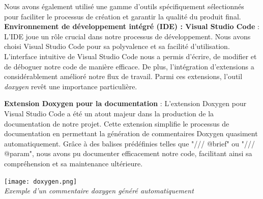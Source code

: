 \documentclass[10pt]{article}
\begin{document}
Nous avons également utilisé une gamme d'outils spécifiquement sélectionnés pour faciliter le processus de création et garantir la qualité du produit final. \\
\textbf{Environnement de développement intégré (IDE) : Visual Studio Code} :
L'IDE joue un rôle crucial dans notre processus de développement. Nous avons choisi Visual Studio Code pour sa polyvalence et sa facilité d'utilisation. L'interface intuitive de Visual Studio Code nous a permis d'écrire, de modifier et de déboguer notre code de manière efficace. De plus, l'intégration d'extensions a considérablement amélioré notre flux de travail. Parmi ces extensions, l'outil \textit{\gls{doxygen}} revêt une importance particulière.

\textbf{Extension Doxygen pour la documentation} :
L'extension Doxygen pour Visual Studio Code a été un atout majeur dans la production de la documentation de notre projet. Cette extension simplifie le processus de documentation en permettant la génération de commentaires Doxygen quasiment automatiquement. Grâce à des balises prédéfinies telles que "/// @brief" ou "/// @param", nous avons pu documenter efficacement notre code, facilitant ainsi sa compréhension et sa maintenance ultérieure.
\begin{center}
\texttt{[image: doxygen.png]}\\
\caption{{\emph{Exemple d'un commentaire doxygen généré automatiquement}}}
\label{fig8}\\
\end{center}
\end{document}
